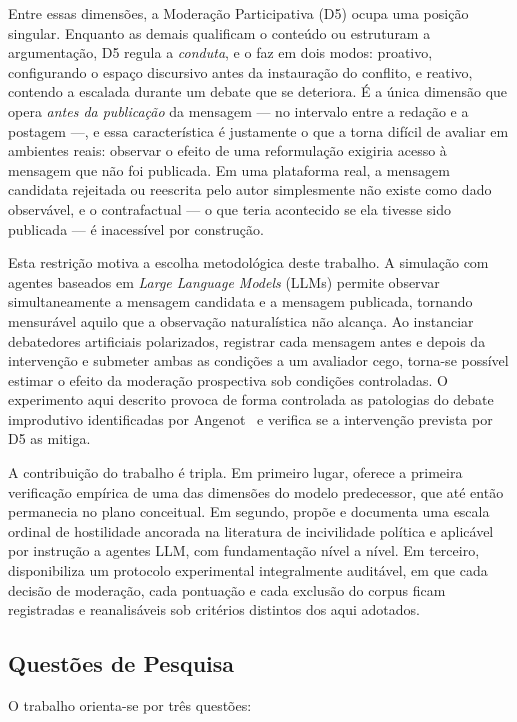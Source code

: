 \documentclass[conference]{IEEEtran} \IEEEoverridecommandlockouts %
\begin{document}
Entre essas dimensões, a Moderação Participativa (D5) ocupa uma posição
singular. Enquanto as demais qualificam o conteúdo ou estruturam a
argumentação, D5 regula a \textit{conduta}, e o faz em dois modos: proativo,
configurando o espaço discursivo antes da instauração do conflito, e reativo,
contendo a escalada durante um debate que se deteriora. É a única dimensão que
opera \textit{antes da publicação} da mensagem — no intervalo entre a redação e
a postagem —, e essa característica é justamente o que a torna difícil de
avaliar em ambientes reais: observar o efeito de uma reformulação exigiria
acesso à mensagem que não foi publicada. Em uma plataforma real, a mensagem
candidata rejeitada ou reescrita pelo autor simplesmente não existe como dado
observável, e o contrafactual — o que teria acontecido se ela tivesse sido
publicada — é inacessível por construção.

Esta restrição motiva a escolha metodológica deste trabalho. A simulação com
agentes baseados em \textit{Large Language Models} (LLMs) permite observar
simultaneamente a mensagem candidata e a mensagem publicada, tornando
mensurável aquilo que a observação naturalística não alcança. Ao instanciar
debatedores artificiais polarizados, registrar cada mensagem antes e depois da
intervenção e submeter ambas as condições a um avaliador cego, torna-se
possível estimar o efeito da moderação prospectiva sob condições controladas.
O experimento aqui descrito provoca de forma controlada as patologias do debate
improdutivo identificadas por Angenot~\cite{angenot2008dialogues} e verifica se
a intervenção prevista por D5 as mitiga.

A contribuição do trabalho é tripla. Em primeiro lugar, oferece a primeira
verificação empírica de uma das dimensões do modelo predecessor, que até então
permanecia no plano conceitual. Em segundo, propõe e documenta uma escala
ordinal de hostilidade ancorada na literatura de incivilidade política e
aplicável por instrução a agentes LLM, com fundamentação nível a nível. Em
terceiro, disponibiliza um protocolo experimental integralmente auditável, em
que cada decisão de moderação, cada pontuação e cada exclusão do corpus ficam
registradas e reanalisáveis sob critérios distintos dos aqui adotados.

\subsection{Questões de Pesquisa}

O trabalho orienta-se por três questões:
\end{document}
